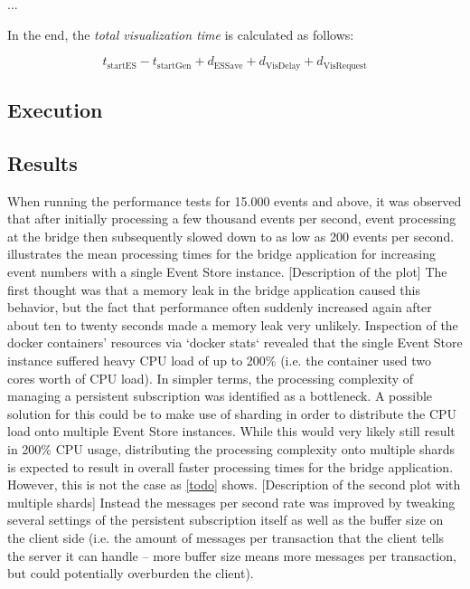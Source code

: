 ...

In the end, the \emph{total visualization time} is calculated as follows:

$$t_\text{startES} - t_\text{startGen}+ d_\text{ESSave} + d_\text{VisDelay} + d_\text{VisRequest}$$


\subsection{Execution}

\subsection{Results}

When running the performance tests for 15.000 events and above, it was observed that after initially processing a few thousand events per second, event processing at the bridge then subsequently slowed down to as low as 200 events per second.
 illustrates the mean processing times for the bridge application for increasing event numbers with a single Event Store instance.
[Description of the plot]
The first thought was that a memory leak in the bridge application caused this behavior, but the fact that performance often suddenly increased again after about ten to twenty seconds made a memory leak very unlikely.
Inspection of the docker containers' resources via `docker stats` revealed that the single Event Store instance suffered heavy CPU load of up to 200\% (i.e. the container used two cores worth of CPU load).
In simpler terms, the processing complexity of managing a persistent subscription was identified as a bottleneck.
A possible solution for this could be to make use of sharding in order to distribute the CPU load onto multiple Event Store instances.
While this would very likely still result in 200\% CPU usage, distributing the processing complexity onto multiple shards is expected to result in overall faster processing times for the bridge application.
However, this is not the case as \cref{todo} shows.
[Description of the second plot with multiple shards]
Instead the messages per second rate was improved by tweaking several settings of the persistent subscription itself as well as the buffer size on the client side (i.e. the amount of messages per transaction that the client tells the server it can handle -- more buffer size means more messages per transaction, but could potentially overburden the client).

